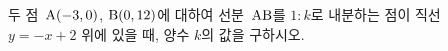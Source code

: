 두 점~$\mathrm{A}(-3{,}\mkern3mu\mathopen{}0)$, $\mathrm{B}(0{,}\mkern3mu\mathopen{}12)$에 대하여 선분~$\mathrm{AB}$를 $1:k$로 내분하는 점이 직선~$y=-x+2$ 위에 있을 때, 양수 $k$의 값을 구하시오.
